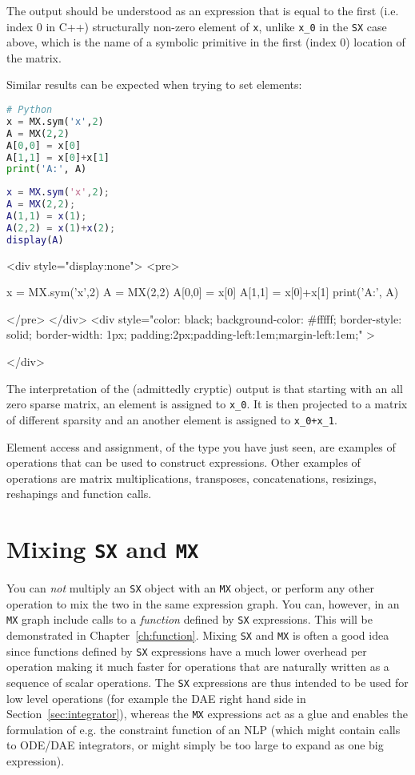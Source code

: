 \documentclass[a4paper,12pt]{book}
\newcounter{pytexcount}
\newcounter{pytexsubcount}
\renewenvironment{pytexoutput}
{\addtocounter{pytexsubcount}{1}%
\begin{rawhtml}
<div style="display:none">
<pre>
\end{rawhtml}
}%
{\begin{rawhtml}
</pre>
</div>
<div style="color: black; background-color: \#fffff;  border-style: solid; border-width: 1px; padding:2px;padding-left:1em;margin-left:1em;" >\end{rawhtml}%
\verbatiminputeval{pytex_\alph{pytexcount}_\arabic{pytexsubcount}.log}%
\begin{rawhtml}
</div>
\end{rawhtml}
}
\begin{document}
The output should be understood as an expression that is equal to the first (i.e. index 0 in C++) structurally non-zero element of \texttt{x}, unlike \texttt{x\_0} in the \texttt{SX} case above, which is the name of a symbolic primitive in the first (index 0) location of the matrix.

Similar results can be expected when trying to set elements:

\begin{minipage}[t]{0.5\textwidth}
\begin{lstlisting}[language=Python]
# Python
x = MX.sym('x',2)
A = MX(2,2)
A[0,0] = x[0]
A[1,1] = x[0]+x[1]
print('A:', A)
\end{lstlisting}
\end{minipage}
\begin{minipage}[t]{0.5\textwidth}
\begin{lstlisting}[language=Matlab]
% MATLAB
x = MX.sym('x',2);
A = MX(2,2);
A(1,1) = x(1);
A(2,2) = x(1)+x(2);
display(A)
\end{lstlisting}
\end{minipage}

\begin{pytexoutput}
x = MX.sym('x',2)
A = MX(2,2)
A[0,0] = x[0]
A[1,1] = x[0]+x[1]
print('A:', A)
\end{pytexoutput}

The interpretation of the (admittedly cryptic) output is that starting with an all zero sparse matrix, an element is assigned to \texttt{x\_0}. It is then projected to a matrix of different sparsity and an another element is assigned to \texttt{x\_0+x\_1}.

Element access and assignment, of the type you have just seen, are examples of operations that can be used to construct expressions. Other examples of operations are matrix multiplications, transposes, concatenations, resizings, reshapings and function calls.

\section{Mixing \texttt{SX} and \texttt{MX}}
You can \emph{not} multiply an \texttt{SX} object with an \texttt{MX} object, or perform any other operation to mix the two in the same expression graph. You can, however, in an \texttt{MX} graph include calls to a \emph{function} defined by \texttt{SX} expressions. This will be demonstrated in Chapter~\ref{ch:function}. Mixing \texttt{SX} and \texttt{MX} is often a good idea since functions defined by \texttt{SX} expressions have a much lower overhead per operation making it much faster for operations that are naturally written as a sequence of scalar operations. The \texttt{SX} expressions are thus intended to be used for low level operations (for example the DAE right hand side in Section~\ref{sec:integrator}), whereas the \texttt{MX} expressions act as a glue and enables the formulation of e.g. the constraint function of an NLP (which might contain calls to ODE/DAE integrators, or might simply be too large to expand as one big expression).
\end{document}
